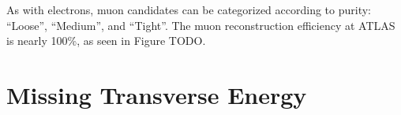 As with electrons, muon candidates can be categorized according to purity: ``Loose'', ``Medium'', and ``Tight''.
The muon reconstruction efficiency at ATLAS is nearly 100\%, as seen in Figure TODO.

\section{Missing Transverse Energy}

% 
% 
% 